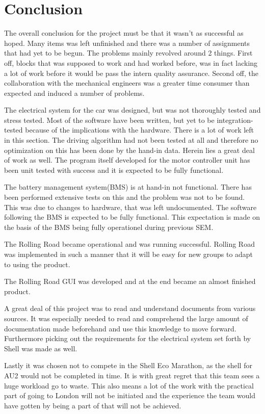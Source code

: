 \chapter{Conclusion}
The overall conclusion for the project must be that it wasn't as successful as hoped. Many items was left unfinished and there was a number of assignments that had yet to be begun. The problems mainly revolved around 2 things. First off, blocks that was supposed to work and had worked before, was in fact lacking a lot of work before it would be pass the intern quality assurance. Second off, the collaboration with the mechanical engineers was a greater time consumer than expected and induced a number of problems.   

The electrical system for the car was designed, but was not thoroughly tested and stress tested. Most of the software have been written, but yet to be integration-tested because of the implications with the hardware. There is a lot of work left in this section. The driving algorithm had not been tested at all and therefore no optimization on this has been done by the hand-in data. Herein lies a great deal of work as well. The program itself developed for the motor controller unit has been unit tested with success and it is expected to be fully functional. 

The battery management system(BMS) is at hand-in not functional. There has been performed extensive tests on this and the problem was not to be found. This was due to changes to hardware, that was left undocumented. The software following the BMS is expected to be fully functional. This expectation is made on the basis of the BMS being fully operationel during previous SEM.

The Rolling Road became operational and was running successful. Rolling Road was implemented in such a manner that it will be easy for new groups to adapt to using the product. 

The Rolling Road GUI was developed and at the end became an almost finished product.

A great deal of this project was to read and understand documents from various sources. It was  especially needed to read and comprehend the large amount of documentation made beforehand and use this knowledge to move forward. Furthermore picking out the requirements for the electrical system set forth by Shell was made as well.

Lastly it was chosen not to compete in the Shell Eco Marathon, as the shell for AU2 would not be completed in time. It is with great regret that this team sees a huge workload go to waste. This also means a lot of the work with the practical part of going to London will not be initiated and the experience the team would have gotten by being a part of that will not be achieved.
